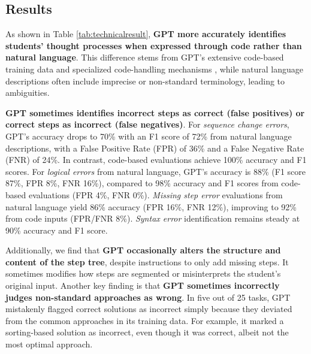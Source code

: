 

\subsection{Results}
As shown in Table \ref{tab:technicalresult}, \textbf{GPT more accurately identifies students' thought processes when expressed through code rather than natural language}. This difference stems from GPT's extensive code-based training data \cite{liu2024your} and specialized code-handling mechanisms \cite{achiam2023gpt}, while natural language descriptions often include imprecise or non-standard terminology, leading to ambiguities.

\textbf{GPT sometimes identifies incorrect steps as correct (false positives) or correct steps as incorrect (false negatives)}. For \emph{sequence change errors}, GPT’s accuracy drops to 70\% with an F1 score of 72\% from natural language descriptions, with a False Positive Rate (FPR) of 36\% and a False Negative Rate (FNR) of 24\%. In contrast, code-based evaluations achieve 100\% accuracy and F1 scores. For \emph{logical errors} from natural language, GPT’s accuracy is 88\% (F1 score 87\%, FPR 8\%, FNR 16\%), compared to 98\% accuracy and F1 scores from code-based evaluations (FPR 4\%, FNR 0\%). \emph{Missing step error} evaluations from natural language yield 86\% accuracy (FPR 16\%, FNR 12\%), improving to 92\% from code inputs (FPR/FNR 8\%). \emph{Syntax error} identification remains steady at 90\% accuracy and F1 score.

Additionally, we find that \textbf{GPT occasionally alters the structure and content of the step tree}, despite instructions to only add missing steps. It sometimes modifies how steps are segmented or misinterprets the student's original input. Another key finding is that \textbf{GPT sometimes incorrectly judges non-standard approaches as wrong}. In five out of 25 tasks, GPT mistakenly flagged correct solutions as incorrect simply because they deviated from the common approaches in its training data. For example, it marked a sorting-based solution as incorrect, even though it was correct, albeit not the most optimal approach.

